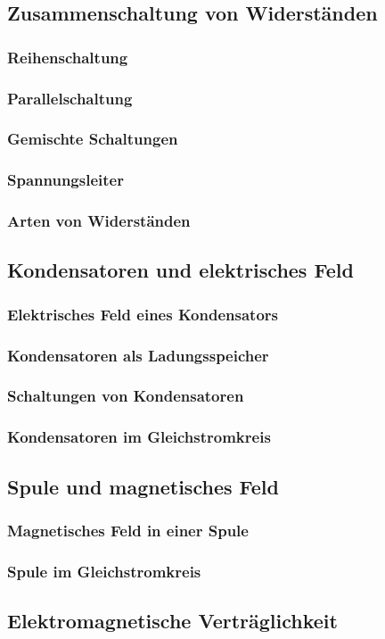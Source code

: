 
\subsection{Zusammenschaltung von Widerständen}
\subsubsection{Reihenschaltung}
\subsubsection{Parallelschaltung}
\subsubsection{Gemischte Schaltungen}
\subsubsection{Spannungsleiter}
\subsubsection{Arten von Widerständen}

\subsection{Kondensatoren und elektrisches Feld}
\subsubsection{Elektrisches Feld eines Kondensators}
\subsubsection{Kondensatoren als Ladungsspeicher}
\subsubsection{Schaltungen von Kondensatoren}
\subsubsection{Kondensatoren im Gleichstromkreis}

\subsection{Spule und magnetisches Feld}
\subsubsection{Magnetisches Feld in einer Spule}
\subsubsection{Spule im Gleichstromkreis}

\subsection{Elektromagnetische Verträglichkeit}

